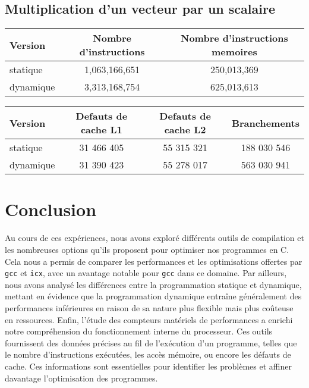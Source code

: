 \documentclass{rapport}
\begin{document}
\subsection{Multiplication d'un vecteur par un scalaire}


\begin{table}[H]
\centering
    \begin{tabular}{|l|c|c|}
    \hline
    Version & Nombre d'instructions & Nombre d'instructions memoires \\
    \hline
    statique & 1,063,166,651 & 250,013,369 \\
    dynamique & 3,313,168,754 & 625,013,613 \\
    \hline
    \end{tabular}
\end{table}

\begin{table}[H]
\centering
    \begin{tabular}{|l|c|c|c|}
    \hline
    Version & Defauts de cache L1 & Defauts de cache L2 & Branchements \\
    \hline
    statique & 31 466 405 & 55 315 321 & 188 030 546 \\
    dynamique & 31 390 423 & 55 278 017 & 563 030 941 \\ 
    \hline
    \end{tabular}
\end{table}


\section{Conclusion}
Au cours de ces expériences, nous avons exploré différents outils de compilation et les nombreuses options qu’ils proposent pour optimiser nos programmes en C. Cela nous a permis de comparer les performances et les optimisations offertes par \texttt{gcc} et \texttt{icx}, avec un avantage notable pour \texttt{gcc} dans ce domaine. Par ailleurs, nous avons analysé les différences entre la programmation statique et dynamique, mettant en évidence que la programmation dynamique entraîne généralement des performances inférieures en raison de sa nature plus flexible mais plus coûteuse en ressources. \newline
Enfin, l’étude des compteurs matériels de performances a enrichi notre compréhension du fonctionnement interne du processeur. Ces outils fournissent des données précises au fil de l’exécution d’un programme, telles que le nombre d’instructions exécutées, les accès mémoire, ou encore les défauts de cache. Ces informations sont essentielles pour identifier les problèmes et affiner davantage l’optimisation des programmes.
\end{document}
